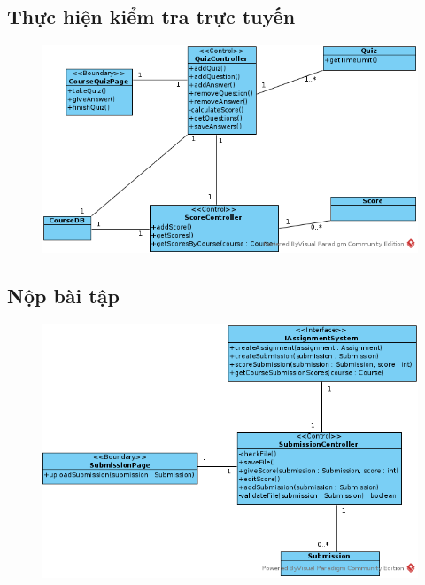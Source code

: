 \documentclass[./../main_file.tex]{subfiles}
\begin{document}
\subsection{Thực hiện kiểm tra trực tuyến}
\begin{figure}[H]
	\centering
	\includegraphics[width=\linewidth]{./images/define_operations/ucd_op_per_take_test.png}
\end{figure}
\subsection{Nộp bài tập}
\begin{figure}[H]
	\centering
	\includegraphics[width=\linewidth]{./images/define_operations/ucd_op_ss_submit_assignment.png}
\end{figure}
\end{document}
